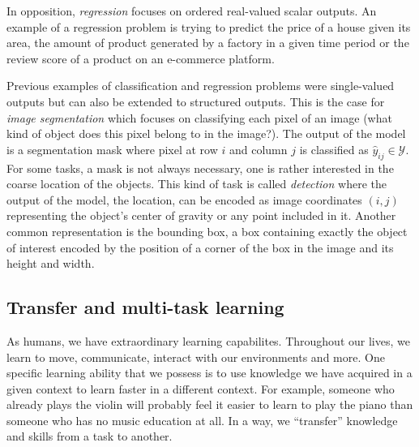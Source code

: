In opposition, \textit{regression} focuses on ordered real-valued scalar outputs. An example of a regression problem is trying to predict the price of a house given its area, the amount of product generated by a factory in a given time period or the review score of a product on an e-commerce platform. 

Previous examples of classification and regression problems were single-valued outputs but can also be extended to structured outputs. This is the case for \textit{image segmentation} which focuses on classifying each pixel of an image (\ie what kind of object does this pixel belong to in the image?). The output of the model is a segmentation mask where pixel at row $i$ and column $j$ is classified as $\hat{y}_{ij} \in \mathcal{Y}$. For some tasks, a mask is not always necessary, one is rather interested in the coarse location of the objects. This kind of task is called \textit{detection} where the output of the model, the location, can be encoded as image coordinates $(i, j)$ representing the object's center of gravity or any point included in it. Another common representation is the bounding box, a box containing exactly the object of interest encoded by the position of a corner of the box in the image and its height and width.


 

\subsection{Transfer and multi-task learning}
\label{ssec:backml:tlandmtl}

As humans, we have extraordinary learning capabilites. Throughout our lives, we learn to move, communicate, interact with our environments and more. One specific learning ability that we possess is to use knowledge we have acquired in a given context to learn faster in a different context. For example, someone who already plays the violin will probably feel it easier to learn to play the piano than someone who has no music education at all. In a way, we ``transfer'' knowledge and skills from a task to another. 

